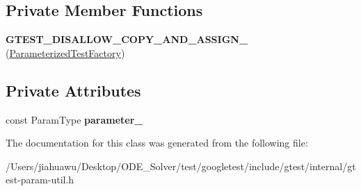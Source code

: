 \subsection*{Private Member Functions}
\begin{DoxyCompactItemize}
\item 
\mbox{\label{classtesting_1_1internal_1_1_parameterized_test_factory_ac70e70bd61d0f66bbc68ed2587c42d92}} 
{\bfseries G\+T\+E\+S\+T\+\_\+\+D\+I\+S\+A\+L\+L\+O\+W\+\_\+\+C\+O\+P\+Y\+\_\+\+A\+N\+D\+\_\+\+A\+S\+S\+I\+G\+N\+\_\+} (\mbox{\hyperlink{classtesting_1_1internal_1_1_parameterized_test_factory}{Parameterized\+Test\+Factory}})
\end{DoxyCompactItemize}
\subsection*{Private Attributes}
\begin{DoxyCompactItemize}
\item 
\mbox{\label{classtesting_1_1internal_1_1_parameterized_test_factory_a9ee3e72cb3b169924b5328009ed48b5e}} 
const Param\+Type {\bfseries parameter\+\_\+}
\end{DoxyCompactItemize}


The documentation for this class was generated from the following file\+:\begin{DoxyCompactItemize}
\item 
/\+Users/jiahuawu/\+Desktop/\+O\+D\+E\+\_\+\+Solver/test/googletest/include/gtest/internal/gtest-\/param-\/util.\+h\end{DoxyCompactItemize}

